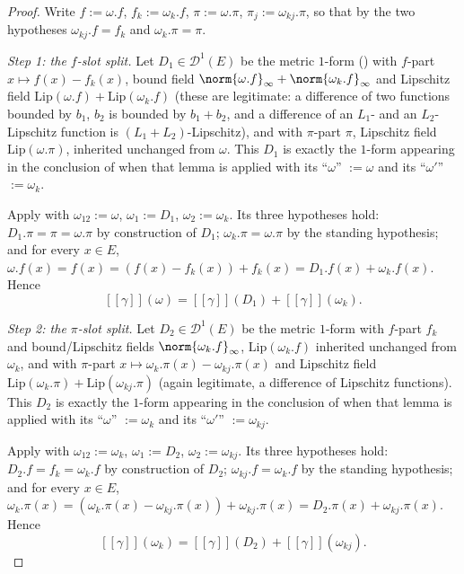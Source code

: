 \begin{proof}
  Write $f := \omega.f$, $f_k := \omega_k.f$, $\pi := \omega.\pi$, $\pi_j := \omega_{kj}.\pi$, so
  that by the two hypotheses $\omega_{kj}.f = f_k$ and $\omega_k.\pi = \pi$.

  \emph{Step 1: the $f$-slot split.} Let $D_1 \in \mathcal{D}^1(E)$ be the metric $1$-form
  () with $f$-part $x \mapsto f(x) - f_k(x)$, bound field
  $\norm{\omega.f}_\infty + \norm{\omega_k.f}_\infty$ and Lipschitz field
  $\mathrm{Lip}(\omega.f) + \mathrm{Lip}(\omega_k.f)$ (these are legitimate: a difference of two
  functions bounded by $b_1$, $b_2$ is bounded by $b_1+b_2$, and a difference of an $L_1$- and an
  $L_2$-Lipschitz function is $(L_1+L_2)$-Lipschitz), and with $\pi$-part $\pi$, Lipschitz field
  $\mathrm{Lip}(\omega.\pi)$, inherited unchanged from $\omega$. This $D_1$ is exactly the $1$-form
  appearing in the conclusion of  when that lemma is applied with its
  ``$\omega$'' $:= \omega$ and its ``$\omega'$'' $:= \omega_k$.

  Apply  with $\omega_{12} := \omega$, $\omega_1 := D_1$,
  $\omega_2 := \omega_k$. Its three hypotheses hold: $D_1.\pi = \pi = \omega.\pi$ by construction of
  $D_1$; $\omega_k.\pi = \omega.\pi$ by the standing hypothesis; and for every $x \in E$,
  $\omega.f(x) = f(x) = (f(x) - f_k(x)) + f_k(x) = D_1.f(x) + \omega_k.f(x)$. Hence
  \[
    [[\gamma]](\omega) = [[\gamma]](D_1) + [[\gamma]](\omega_k)
    . \tag{1}
  \]

  \emph{Step 2: the $\pi$-slot split.} Let $D_2 \in \mathcal{D}^1(E)$ be the metric $1$-form with
  $f$-part $f_k$ and bound/Lipschitz fields $\norm{\omega_k.f}_\infty$, $\mathrm{Lip}(\omega_k.f)$
  inherited unchanged from $\omega_k$, and with $\pi$-part $x \mapsto \omega_k.\pi(x) -
  \omega_{kj}.\pi(x)$ and Lipschitz field $\mathrm{Lip}(\omega_k.\pi) + \mathrm{Lip}(\omega_{kj}.\pi)$
  (again legitimate, a difference of Lipschitz functions). This $D_2$ is exactly the $1$-form
  appearing in the conclusion of  when that lemma is applied with its
  ``$\omega$'' $:= \omega_k$ and its ``$\omega'$'' $:= \omega_{kj}$.

  Apply  with $\omega_{12} := \omega_k$, $\omega_1 := D_2$,
  $\omega_2 := \omega_{kj}$. Its three hypotheses hold: $D_2.f = f_k = \omega_k.f$ by construction of
  $D_2$; $\omega_{kj}.f = \omega_k.f$ by the standing hypothesis; and for every $x \in E$,
  $\omega_k.\pi(x) = (\omega_k.\pi(x) - \omega_{kj}.\pi(x)) + \omega_{kj}.\pi(x) = D_2.\pi(x) +
  \omega_{kj}.\pi(x)$. Hence
  \[
    [[\gamma]](\omega_k) = [[\gamma]](D_2) + [[\gamma]](\omega_{kj})
    . \tag{2}
  \]


\end{proof}
